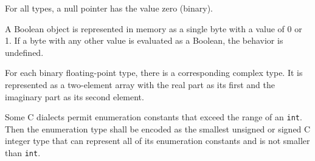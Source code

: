 \documentclass[USenglish,fontsize=11pt,twoside,%
  toc=bib,toc=idx,toc=graduated,numbers=noendperiod,
  bookmarks=true,
  bookmarksnumbered=true,
  bookmarksopen=true,
  bookmarksopenlevel=1,
  breaklinks=true,
  colorlinks=true,
  linkcolor=black,
  pdfpagelayout={TwoPageRight},
  pdfusetitle=true
]{scrreprt}
\begin{document}
For all types, a null pointer has the value zero (binary).

A Boolean object is represented in memory as a single byte
with a value of 0 or 1.  If a byte with any other value is evaluated as a
Boolean, the behavior is undefined.

For each binary floating-point type, there is a corresponding complex
type.  It is represented as a two-element array with
the real part as its first and the imaginary part as its second element.

Some C dialects permit enumeration constants that exceed the range of an
\texttt{int}.  Then the enumeration type shall be
encoded as the smallest unsigned or signed C integer type that can
represent all of its enumeration constants and is not smaller than
\texttt{int}.
\end{document}
